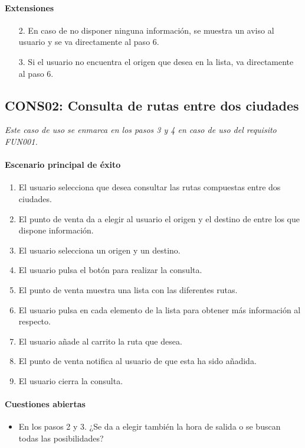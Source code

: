     \paragraph{Extensiones}
    \begin{enumerate}
      \item[2.] En caso de no disponer ninguna información, se muestra un aviso al usuario y se va directamente al paso 6.
      \item[3.] Si el usuario no encuentra el origen que desea en la lista, va directamente al paso 6.
    \end{enumerate}

  \subsection{CONS02: Consulta de rutas entre dos ciudades}
    \emph{Este caso de uso se enmarca en los pasos 3 y 4 en caso de uso del requisito FUN001.}
    \paragraph{Escenario principal de éxito}
    \begin{enumerate}
      \item El usuario selecciona que desea consultar las rutas compuestas entre dos ciudades.
      \item El punto de venta da a elegir al usuario el origen y el destino de entre los que dispone información.
      \item El usuario selecciona un origen y un destino.
      \item El usuario pulsa el botón para realizar la consulta.
      \item El punto de venta muestra una lista con las diferentes rutas.
      \item El usuario pulsa en cada elemento de la lista para obtener más información al respecto.
      \item El usuario añade al carrito la ruta que desea.
      \item El punto de venta notifica al usuario de que esta ha sido añadida.
      \item El usuario cierra la consulta.
    \end{enumerate}

    \paragraph{Cuestiones abiertas}
    \begin{itemize}
       \item En los pasos 2 y 3. ¿Se da a elegir también la hora de salida o se buscan todas las posibilidades?
    \end{itemize}

